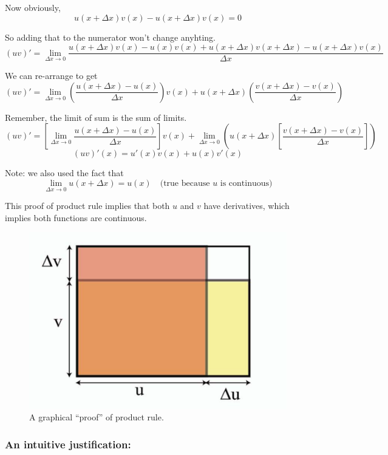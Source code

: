 Now obviously, $$u(x+\Delta x)v(x) - u(x+\Delta x)v(x) = 0$$

So adding that to the numerator won't change anyhting.
$$
(uv)' = \lim_{\Delta x \to 0} 
	\frac{
		u(x+\Delta x)v(x)
		- u(x)v(x)
		+ u(x+\Delta x)v(x+\Delta x)
		- u(x+\Delta x)v(x)
	}{\Delta x}
$$

We can re-arrange to get
$$
(uv)' = \lim_{\Delta x \to 0} 
	\left( \frac{u(x+\Delta x) - u(x)}{\Delta x} \right) v(x) +
	u(x+\Delta x) \left( \frac{v(x+\Delta x) - v(x)}{\Delta x} \right) 
$$

Remember, the limit of sum is the sum of limits.
$$
(uv)' = \left[ \lim_{\Delta x \to 0} \frac{u(x+\Delta x) - u(x)}{\Delta x} \right] v(x) +
	\lim_{\Delta x \to 0} \left( u(x+\Delta x) \left[ \frac{v(x+\Delta x) - v(x)}{\Delta x} \right] \right)
$$
$$(uv)'(x) = u'(x)v(x) + u(x)v'(x)$$

Note: we also used the fact that $$ \lim_{\Delta x \to 0} u(x+\Delta x) = u(x) \quad \text{(true because $u$ is continuous)}$$

This proof of product rule implies that both $u$ and $v$ have derivatives, which implies both functions are continuous.

\begin{figure}[ht!]
	\centering
	\includegraphics[scale=0.4]{./images/lecture_3_figure_1.png}
	\caption{A graphical ``proof'' of product rule.}    
\end{figure}

\subsubsection*{An intuitive justification:}

